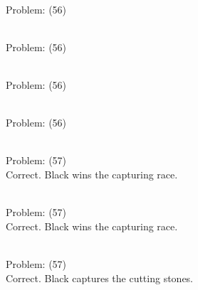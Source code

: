 \documentclass[11pt]{article}
\begin{document}
\begin{minipage}[t]{0.5\textwidth}
  {\centering
  
\\
Problem: (56)\\
  }
\end{minipage}
\begin{minipage}[t]{0.5\textwidth}
  {\centering
  
\\
Problem: (56)\\
  }
\end{minipage}
\begin{minipage}[t]{0.5\textwidth}
  {\centering
  
\\
Problem: (56)\\
  }
\end{minipage}
\begin{minipage}[t]{0.5\textwidth}
  {\centering
  
\\
Problem: (56)\\
  }
\end{minipage}
\begin{minipage}[t]{0.5\textwidth}
  {\centering
  
\\
Problem: (57)\\
Correct. Black wins the capturing race.\\
  }
\end{minipage}
\begin{minipage}[t]{0.5\textwidth}
  {\centering
  
\\
Problem: (57)\\
Correct. Black wins the capturing race.\\
  }
\end{minipage}
\begin{minipage}[t]{0.5\textwidth}
  {\centering
  
\\
Problem: (57)\\
Correct. Black captures the cutting stones.\\
  }
\end{minipage}
\end{document}
